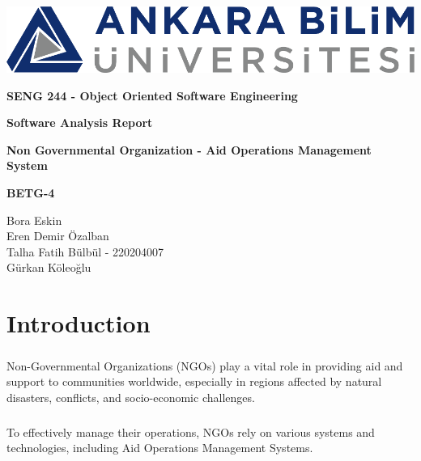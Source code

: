 \documentclass[a4paper,12pt]{report}
\begin{document}
	\begin{titlepage}
		\begin{center}
			\includegraphics{ankara_bilim.png}
		\end{center}
		\vspace{1cm}
		\begin{center}
			\LARGE
			\textbf{SENG 244 - Object Oriented Software Engineering}
		\end{center}
		\vspace{1cm}
		\begin{center}
			\Large
			\textbf{Software Analysis Report}
		\end{center}
		\vspace{1cm}
		\begin{center}
			\Large
			\textbf{Non Governmental Organization - Aid Operations Management System}
		\end{center}
		\vspace{2cm}
		\begin{center}
			\large
			\textbf{BETG-4}
		\end{center}
		\vspace{1cm}
		\begin{center}
			\large
			Bora Eskin\\
			Eren Demir Özalban\\
			Talha Fatih Bülbül - 220204007\\
			Gürkan Köleoğlu
		\end{center}
	\end{titlepage}
	\tableofcontents
	\chapter{Introduction}
 		\paragraph{} Non-Governmental Organizations (NGOs) play a vital role in providing aid and support to communities worldwide, especially in regions affected by natural disasters, conflicts, and socio-economic challenges.
         	\paragraph{} To effectively manage their operations, NGOs rely on various systems and technologies, including Aid Operations Management Systems.
\end{document}
